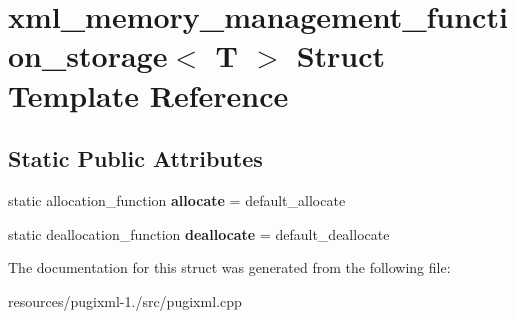 \hypertarget{structxml__memory__management__function__storage}{\section{xml\+\_\+memory\+\_\+management\+\_\+function\+\_\+storage$<$ T $>$ Struct Template Reference}
\label{structxml__memory__management__function__storage}
}
\subsection*{Static Public Attributes}
\begin{DoxyCompactItemize}
\item 
\hypertarget{structxml__memory__management__function__storage_abb6865f8d07d27fd9273737c59f6e941}{static allocation\+\_\+function {\bfseries allocate} = default\+\_\+allocate}\label{structxml__memory__management__function__storage_abb6865f8d07d27fd9273737c59f6e941}

\item 
\hypertarget{structxml__memory__management__function__storage_a1c80a9a045ed6cfb90b17a178e4b3512}{static deallocation\+\_\+function {\bfseries deallocate} = default\+\_\+deallocate}\label{structxml__memory__management__function__storage_a1c80a9a045ed6cfb90b17a178e4b3512}

\end{DoxyCompactItemize}


The documentation for this struct was generated from the following file\+:\begin{DoxyCompactItemize}
\item 
resources/pugixml-\/1./src/pugixml.\+cpp\end{DoxyCompactItemize}
